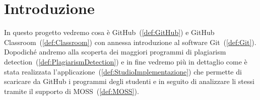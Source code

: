 
\chapter*{Introduzione}

	In questo progetto vedremo cosa è GitHub~(\ref{def:GitHub}) e GitHub Classroom~(\ref{def:Classroom}) con annessa introduzione al software Git~(\ref{def:Git}). Dopodiché andremo alla scoperta dei maggiori programmi di plagiarism detection~(\ref{def:PlagiarismDetection}) e in fine vedremo più in dettaglio come è stata realizzata l'applicazione~(\ref{def:StudioImplementazione}) che permette di scaricare da GitHub i programmi degli studenti e in seguito di analizzare li stessi tramite il supporto di MOSS~(\ref{def:MOSS}).
